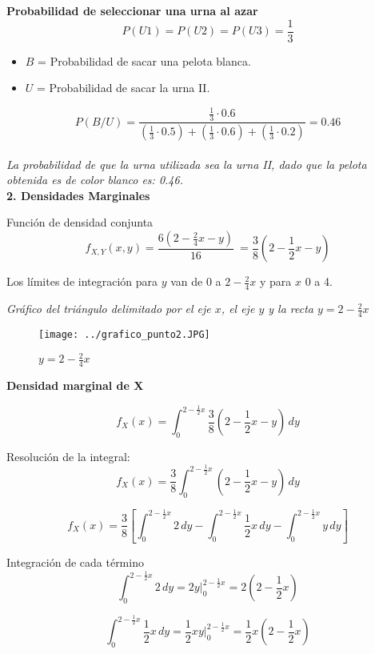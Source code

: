 \documentclass{article}
\begin{document}
{\bfseries Probabilidad de seleccionar una urna al azar}
    \[ P(U1) = P(U2) = P(U3) = \frac{1}{3} \]

\begin{itemize}
    \item $B$ = Probabilidad de sacar una pelota blanca.
    \item $U$ = Probabilidad de sacar la urna II.
\end{itemize}

\[
P(B/U) = \frac{\frac{1}{3} \cdot 0.6}{\left(\frac{1}{3} \cdot 0.5\right) + \left(\frac{1}{3} \cdot 0.6\right) + \left(\frac{1}{3} \cdot 0.2\right)} = 0.46
\]
\\
\textit{\large La probabilidad de que la urna utilizada sea la urna II, dado que la pelota obtenida es de color blanco es: 0.46.}
\\

{\bfseries 2. Densidades Marginales} 

Función de densidad conjunta
\[ f_{X,Y}(x,y) = \frac{6(2 - \frac{2}{4}x - y)}{16} \ = \frac{3}{8} \left(2 - \frac{1}{2}x - y\right) \]

Los límites de integración para $y$ van de 0 a $ 2 - \frac{2}{4}x$ y para $x$ 0 a 4.

\textit{Gráfico del triángulo delimitado por el eje $x$, el eje $y$ y la recta $y=2 - \frac{2}{4}x$}

\begin{figure}[h] 
    \centering
    \texttt{[image: ../grafico\_punto2.JPG]}
    \caption{$y=2 - \frac{2}{4}x$}
\end{figure}

{\bfseries Densidad marginal de X}

\[ f_X(x) = \int_{0}^{2 - \frac{1}{2} x} \frac{3}{8} \left(2 - \frac{1}{2} x - y\right) \, dy \]

Resolución de la integral:
\[ f_X(x) = \frac{3}{8} \int_{0}^{2 - \frac{1}{2} x} \left(2 - \frac{1}{2} x - y\right) \, dy \]

\[ f_X(x) = \frac{3}{8} \left[ \int_{0}^{2 - \frac{1}{2} x} 2 \, dy - \int_{0}^{2 - \frac{1}{2} x} \frac{1}{2} x \, dy - \int_{0}^{2 - \frac{1}{2} x} y \, dy \right] \]

Integración de cada término
\[ \int_{0}^{2 - \frac{1}{2} x} 2 \, dy = 2y \Bigg|_{0}^{2 - \frac{1}{2} x} = 2 \left(2 - \frac{1}{2} x\right) \]

\[ \int_{0}^{2 - \frac{1}{2} x} \frac{1}{2} x \, dy = \frac{1}{2} x y \Bigg|_{0}^{2 - \frac{1}{2} x} = \frac{1}{2} x \left(2 - \frac{1}{2} x\right) \]
\end{document}
